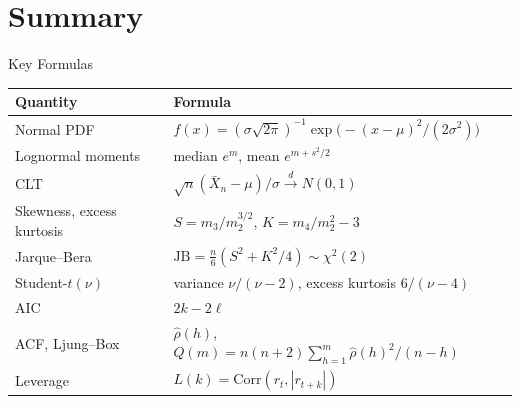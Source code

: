 \section{Summary}

\begin{frame}{Key Formulas}
\itemsize{\small}
\begin{center}
\footnotesize
\begin{tabular}{ll}
\toprule
\textbf{Quantity} & \textbf{Formula} \\
\midrule
Normal PDF & $f(x) = (\sigma\sqrt{2\pi})^{-1}\exp\big(-(x - \mu)^2/(2\sigma^2)\big)$ \\
Lognormal moments & median $e^m$, mean $e^{m + s^2/2}$ \\
CLT & $\sqrt{n}(\bar X_n - \mu)/\sigma \xrightarrow{d} N(0,1)$ \\
Skewness, excess kurtosis & $S = m_3/m_2^{3/2}$, \quad $K = m_4/m_2^2 - 3$ \\
Jarque--Bera & $\text{JB} = \frac{n}{6}(S^2 + K^2/4) \sim \chi^2(2)$ \\
Student-$t(\nu)$ & variance $\nu/(\nu - 2)$, excess kurtosis $6/(\nu - 4)$ \\
AIC & $2k - 2\ell$ \\
ACF, Ljung--Box & $\hat\rho(h)$, \quad $Q(m) = n(n+2)\sum_{h=1}^m \hat\rho(h)^2/(n - h)$ \\
Leverage & $L(k) = \text{Corr}(r_t, |r_{t+k}|)$ \\
\bottomrule
\end{tabular}
\end{center}
\end{frame}

